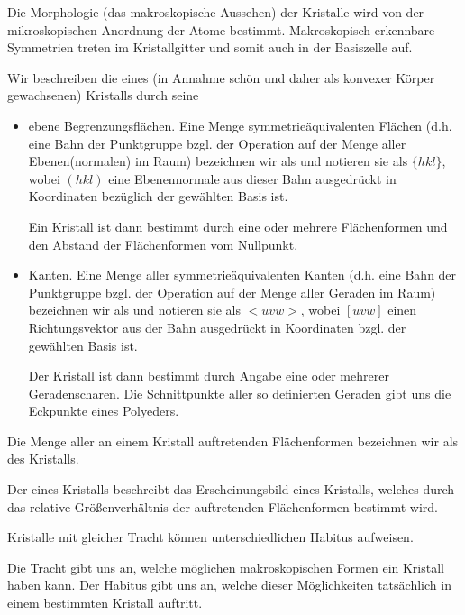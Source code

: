 

Die Morphologie (das makroskopische Aussehen) der Kristalle wird von der mikroskopischen Anordnung der Atome bestimmt. Makroskopisch erkennbare Symmetrien treten im Kristallgitter und somit auch in der Basiszelle auf.

\begin{definition}
Wir beschreiben die  eines (in Annahme schön und daher als konvexer Körper gewachsenen) Kristalls durch seine
\begin{itemize}
	\item ebene Begrenzungsflächen. Eine Menge symmetrieäquivalenten Flächen (d.h. eine Bahn der Punktgruppe bzgl. der Operation auf der Menge aller Ebenen(normalen) im Raum) bezeichnen wir als  und notieren sie als $\{hkl\}$, wobei $(hkl)$ eine Ebenennormale aus dieser Bahn ausgedrückt in Koordinaten bezüglich der gewählten Basis ist.
	
	Ein Kristall ist dann bestimmt durch eine oder mehrere Flächenformen und den Abstand der Flächenformen vom Nullpunkt.
	\item Kanten. Eine Menge aller symmetrieäquivalenten Kanten (d.h. eine Bahn der Punktgruppe bzgl. der Operation auf der Menge aller Geraden im Raum) bezeichnen wir als  und notieren sie als $<uvw>$, wobei $[uvw]$ einen Richtungsvektor aus der Bahn ausgedrückt in Koordinaten bzgl. der gewählten Basis ist.
	
	Der Kristall ist dann bestimmt durch Angabe eine oder mehrerer Geradenscharen. Die Schnittpunkte aller so definierten Geraden gibt uns die Eckpunkte eines Polyeders.
\end{itemize}
\end{definition}

\begin{definition}
Die Menge aller an einem Kristall auftretenden Flächenformen bezeichnen wir als  des Kristalls.
\end{definition}

\begin{definition}
Der  eines Kristalls beschreibt das Erscheinungsbild eines Kristalls, welches durch das  relative Größenverhältnis der auftretenden Flächenformen bestimmt wird. 
\end{definition}

\begin{remark}
Kristalle mit gleicher Tracht können unterschiedlichen Habitus aufweisen.

Die Tracht gibt uns an, welche möglichen makroskopischen Formen ein Kristall haben kann. Der Habitus gibt uns an, welche dieser Möglichkeiten tatsächlich in einem bestimmten Kristall auftritt.
\end{remark}

